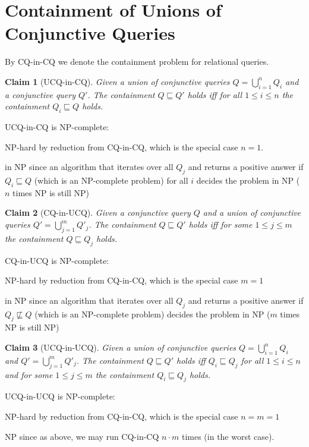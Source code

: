 \documentclass[a4paper,12pt]{article}
\newtheorem{claim}{Claim}
\begin{document}
\section{Containment of Unions of Conjunctive Queries}

By CQ-in-CQ we denote the containment problem for relational queries.

\begin{claim}[UCQ-in-CQ]
Given a union of conjunctive queries $Q = \bigcup_{i=1}^n Q_i$ and a conjunctive query $Q'$. The containment $Q \sqsubseteq Q'$ holds iff for all $1 \leq i \leq n$ the containment $Q_i \sqsubseteq Q$ holds.
\end{claim}

UCQ-in-CQ is NP-complete:

\begin{description}
\item{NP-hard} by reduction from CQ-in-CQ, which is the special case $n = 1$.
\item{in NP} since an algorithm that iterates over all $Q_j$ and returns a positive answer if $Q_i \sqsubseteq Q$ (which is an NP-complete problem) for all $i$ decides the problem in NP ($n$ times NP is still NP)
\end{description}

\begin{claim}[CQ-in-UCQ]
Given a conjunctive query $Q$ and a union of conjunctive queries $Q' = \bigcup_{j=1}^m Q'_j$. The containment $Q \sqsubseteq Q'$ holds iff for some $1 \leq j \leq m$ the containment $Q \sqsubseteq Q_j$ holds.
\end{claim}

CQ-in-UCQ is NP-complete:

\begin{description}
\item{NP-hard} by reduction from CQ-in-CQ, which is the special case $m = 1$
\item{in NP} since an algorithm that iterates over all $Q_j$ and returns a positive answer if $Q_j \not \sqsubseteq Q$ (which is an NP-complete problem) decides the problem in NP ($m$ times NP is still NP)
\end{description}

\begin{claim}[UCQ-in-UCQ]
Given a union of conjunctive queries $Q = \bigcup_{i=1}^n Q_i$ and $Q' = \bigcup_{j=1}^m Q'_j$. The containment $Q \sqsubseteq Q'$ holds iff $Q_i \sqsubseteq Q_j$ for all $1 \leq i \leq n$ and for some $1 \leq j \leq m$ the containment $Q_i \sqsubseteq Q_j$ holds.
\end{claim}

UCQ-in-UCQ is NP-complete:

\begin{description}
\item{NP-hard} by reduction from CQ-in-CQ, which is the special case $n = m = 1$
\item{NP} since as above, we may run CQ-in-CQ $n \cdot m$ times (in the worst case).
\end{description}
\end{document}
